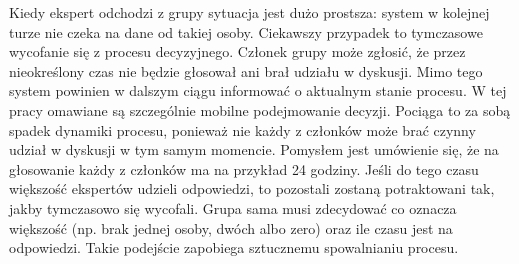 Kiedy ekspert odchodzi z grupy sytuacja jest dużo prostsza: system w kolejnej 
turze nie czeka na dane od takiej osoby. Ciekawszy przypadek to tymczasowe 
wycofanie się z procesu decyzyjnego. Członek grupy może zgłosić, że przez 
nieokreślony czas nie będzie głosował ani brał udziału w dyskusji. Mimo tego 
system powinien w dalszym ciągu informować o aktualnym stanie procesu. W tej 
pracy omawiane są szczególnie mobilne podejmowanie decyzji. Pociąga to za sobą 
spadek dynamiki procesu, ponieważ nie każdy z członków może brać czynny udział 
w dyskusji w tym samym momencie. Pomysłem jest umówienie się, że na głosowanie 
każdy z członków ma na przykład 24 godziny. Jeśli do tego czasu większość 
ekspertów udzieli odpowiedzi, to pozostali zostaną potraktowani tak, jakby 
tymczasowo się wycofali. Grupa sama musi zdecydować co oznacza większość (np. 
brak jednej osoby, dwóch albo zero) oraz ile czasu jest na odpowiedzi. Takie 
podejście zapobiega sztucznemu spowalnianiu procesu.


